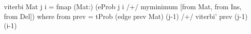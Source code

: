 viterbi Mat j i = fmap (Mat:)
  (eProb j i /+/ myminimum [from Mat, from Ins, from Del])
 where from prev = tProb (edge prev Mat) (j-1) /+/
                               viterbi' prev (j-1) (i-1)
